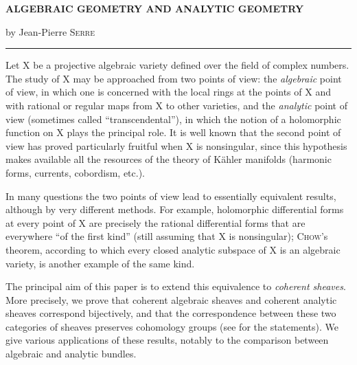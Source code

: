 \begin{center}
{\Large\bfseries ALGEBRAIC GEOMETRY AND ANALYTIC GEOMETRY}

\medskip
by Jean-Pierre \textsc{Serre}

\medskip
\rule{2.5cm}{0.4pt}
\end{center}

\tableofcontents


Let $\mathrm{X}$ be a projective algebraic variety defined over the field of complex numbers. The study of $\mathrm{X}$ may be approached from two points of view: the \textit{algebraic} point of view, in which one is concerned with the local rings at the points of $\mathrm{X}$ and with rational or regular maps from $\mathrm{X}$ to other varieties, and the \textit{analytic} point of view (sometimes called ``transcendental''), in which the notion of a holomorphic function on $\mathrm{X}$ plays the principal role. It is well known that the second point of view has proved particularly fruitful when $\mathrm{X}$ is nonsingular, since this hypothesis makes available all the resources of the theory of K\"ahler manifolds (harmonic forms, currents, cobordism, etc.).

In many questions the two points of view lead to essentially equivalent results, although by very different methods. For example, holomorphic differential forms at every point of $\mathrm{X}$ are precisely the rational differential forms that are everywhere ``of the first kind'' (still assuming that $\mathrm{X}$ is nonsingular); \textsc{Chow}'s theorem, according to which every closed analytic subspace of $\mathrm{X}$ is an algebraic variety, is another example of the same kind.

The principal aim of this paper is to extend this equivalence to \textit{coherent sheaves}. More precisely, we prove that coherent algebraic sheaves and coherent analytic sheaves correspond bijectively, and that the correspondence between these two categories of sheaves preserves cohomology groups (see  for the statements). We give various applications of these results, notably to the comparison between algebraic and analytic bundles.

